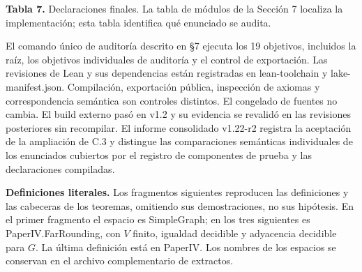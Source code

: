 \documentclass[spanish,11pt,a4paper]{article}
\begin{document}
\textbf{Tabla 7.} Declaraciones finales. La tabla de módulos de la Sección 7 localiza la implementación; esta tabla identifica qué enunciado se audita.

El comando único de auditoría descrito en §7 ejecuta los 19 objetivos, incluidos la raíz, los objetivos individuales de auditoría y el control de exportación. Las revisiones de Lean y sus dependencias están registradas en lean-toolchain y lake-manifest.json. Compilación, exportación pública, inspección de axiomas y correspondencia semántica son controles distintos. El congelado de fuentes no cambia. El build externo pasó en v1.2 y su evidencia se revalidó en las revisiones posteriores sin recompilar. El informe consolidado v1.22-r2 registra la aceptación de la ampliación de C.3 y distingue las comparaciones semánticas individuales de los enunciados cubiertos por el registro de componentes de prueba y las declaraciones compiladas.

\textbf{Definiciones literales.} Los fragmentos siguientes reproducen las definiciones y las cabeceras de los teoremas, omitiendo sus demostraciones, no sus hipótesis. En el primer fragmento el espacio es {\ttfamily\small SimpleGraph}; en los tres siguientes es {\ttfamily\small PaperIV.\discretionary{\hbox{\ensuremath{\hookrightarrow}}}{}{}FarRounding}, con \(V\) finito, igualdad decidible y adyacencia decidible para \(G\). La última definición está en {\ttfamily\small PaperIV}. Los nombres de los espacios se conservan en el archivo complementario de extractos.
\end{document}
